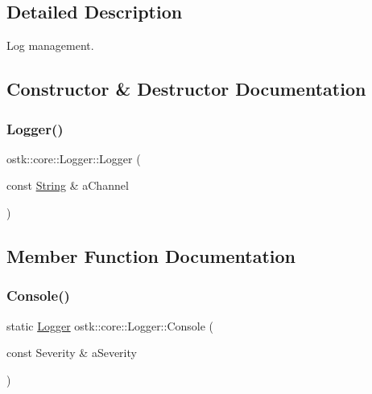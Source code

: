 \subsection{Detailed Description}
Log management. 

\subsection{Constructor \& Destructor Documentation}
\mbox{\label{classostk_1_1core_1_1_logger_afc4760c6468b14aa75abec4624dfd7ea}} 
\subsubsection{\texorpdfstring{Logger()}{Logger()}}
{\footnotesize\ttfamily ostk\+::core\+::\+Logger\+::\+Logger (\begin{DoxyParamCaption}\item[{const \hyperlink{classostk_1_1core_1_1types_1_1_string}{String} \&}]{a\+Channel }\end{DoxyParamCaption})}



\subsection{Member Function Documentation}
\mbox{\label{classostk_1_1core_1_1_logger_a1aeb05d2b956ccacf4c8cd5942ba8501}} 
\subsubsection{\texorpdfstring{Console()}{Console()}\hspace{0.1cm}{\footnotesize\ttfamily [1/2]}}
{\footnotesize\ttfamily static \hyperlink{classostk_1_1core_1_1_logger}{Logger} ostk\+::core\+::\+Logger\+::\+Console (\begin{DoxyParamCaption}\item[{const Severity \&}]{a\+Severity }\end{DoxyParamCaption})\hspace{0.3cm}{\ttfamily [static]}}

